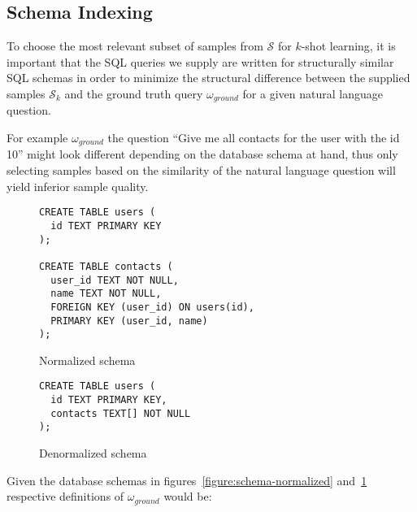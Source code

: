 \subsection{Schema Indexing}

To choose the most relevant subset of samples from $\mathcal{S}$ for $k$-shot learning,
it is important that the SQL queries we supply are written for structurally similar SQL schemas
in order to minimize the structural difference between the supplied samples $\mathcal{S}_k$ and
the ground truth query $\omega_{ground}$ for a given natural language question.

For example $\omega_{ground}$ the question ``Give me all contacts for the user with the id 10''
might look different depending on the database schema at hand, thus only selecting
samples based on the similarity of the natural language question will yield inferior
sample quality.

\begin{figure}[ht]
  \vspace{1em}
  \hfill
  \begin{minipage}[b]{0.45\linewidth}
    \begin{verbatim}
CREATE TABLE users (
  id TEXT PRIMARY KEY
);

CREATE TABLE contacts (
  user_id TEXT NOT NULL,
  name TEXT NOT NULL,
  FOREIGN KEY (user_id) ON users(id),
  PRIMARY KEY (user_id, name)
);
    \end{verbatim}
    \caption{Normalized schema}
    \label{figure:schema-normalized}
  \end{minipage}
  \hfill
  \begin{minipage}[b]{0.35\linewidth}
    \begin{verbatim}
CREATE TABLE users (
  id TEXT PRIMARY KEY,
  contacts TEXT[] NOT NULL
);
    \end{verbatim}
    \vspace{3.75em}
    \caption{Denormalized schema}
    \label{figure:schema-denormalized}
  \end{minipage}
  \hfill
  \vspace{1em}
\end{figure}

Given the database schemas in figures~\ref{figure:schema-normalized} and~\ref{figure:schema-denormalized}
respective definitions of $\omega_{ground}$ would be:


